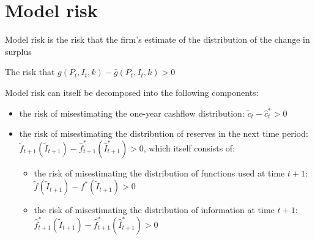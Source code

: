 \section{Model risk}
Model risk is the risk that the firm's estimate of the distribution of the change in surplus
\begin{definition}
The risk that $ g \left( P_t, I_t, k \right) - \hat{g} \left( P_t, I_t, k \right) > 0 $
\end{definition}
%
Model risk can itself be decomposed into the following components:
\begin{itemize}
\item the risk of misestimating the one-year cashflow distribution: $ \tilde{c}_t - \hat{c}^*_t > 0 $

\item the risk of misestimating the distribution of reserves in the next time period: $ \tilde{f}_{t+1} \left( \tilde{I}_{t+1} \right) - \hat{f}^*_{t+1} \left( \hat{I}^*_{t+1} \right) > 0 $, which itself consists of:

\begin{itemize}
\item the risk of misestimating the distribution of functions used at time $ t+1 $: $ \tilde{f} \left( \tilde{I}_{t+1} \right) - f^* \left( \tilde{I}_{t+1} \right) > 0 $
\item the risk of misestimating the distribution of information at time $ t+1 $:\\
$ \hat{f}^*_{t+1} \left( \tilde{I}_{t+1} \right) - \hat{f}^*_{t+1} \left( \hat{I}^*_{t+1} \right) > 0 $
\end{itemize}
\end{itemize}

